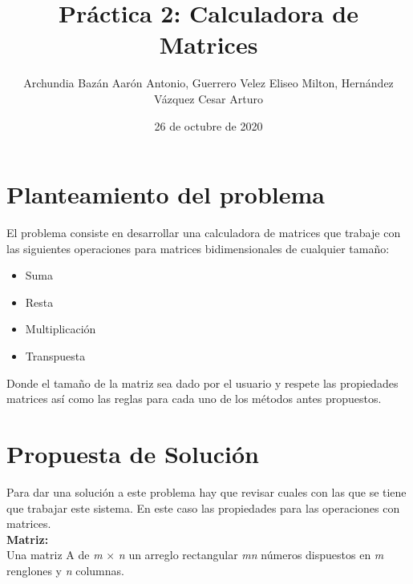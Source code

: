 \documentclass[letter]{revtex4}
\begin{document}
\title{Práctica 2: Calculadora de Matrices}
\author{Archundia Bazán Aarón Antonio, Guerrero Velez Eliseo Milton, Hernández Vázquez Cesar Arturo}

\date{26 de octubre de 2020}
\maketitle


\section{Planteamiento del problema}

El problema consiste en desarrollar una calculadora de matrices que trabaje con las siguientes operaciones para matrices bidimensionales de cualquier tamaño: 
\begin{itemize}
    \item Suma
    \item Resta
    \item Multiplicación
    \item Transpuesta
\end{itemize}
Donde el tamaño de la matriz sea dado por el usuario y respete las propiedades matrices así como las reglas para cada uno de los métodos antes propuestos.

\section{Propuesta de Solución}
Para dar una solución a este problema hay que revisar cuales con las que se tiene que trabajar este sistema. En este caso las propiedades para las operaciones con  matrices.  \\ 
  \textbf{Matriz:} \\
  Una matriz A de \emph{m} $\times$ \emph{n}  un arreglo rectangular \emph{mn} números dispuestos en \emph{m} renglones y \emph{n} columnas.
  
\end{document}
